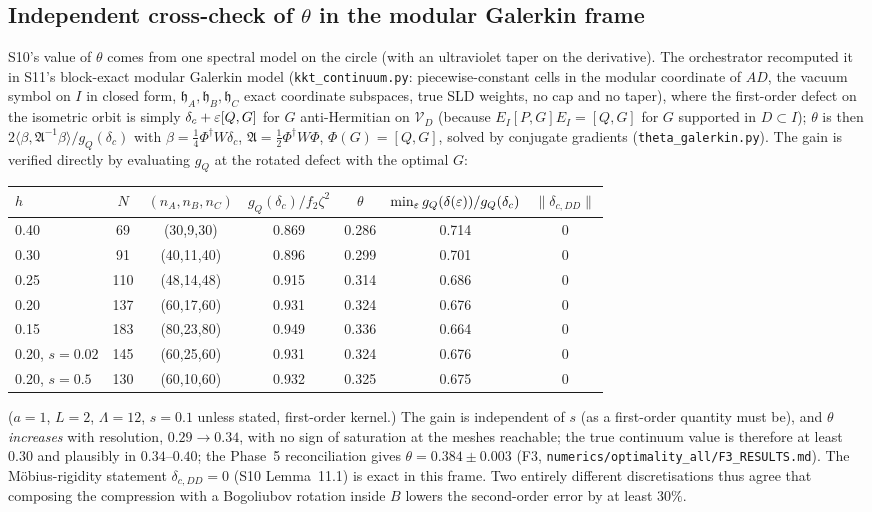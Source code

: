 \documentclass[11pt,a4paper]{article}
\newcommand{\hh}{\mathfrak h}\newcommand{\Var}{\operatorname{Var}}
\begin{document}
\subsection{Independent cross-check of \(\theta\) in the modular Galerkin frame}\label{sec:galerkin}
S10's value of \(\theta\) comes from one spectral model on the circle (with an ultraviolet taper on
the derivative).  The orchestrator recomputed it in S11's block-exact modular Galerkin model
(\texttt{kkt\_continuum.py}: piecewise-constant cells in the modular coordinate of \(AD\), the
vacuum symbol on \(I\) in closed form, \(\hh_A,\hh_B,\hh_C\) exact coordinate subspaces, true SLD
weights, no cap and no taper), where the first-order defect on the isometric orbit is simply
\(\delta_c+\varepsilon[Q,G]\) for \(G\) anti-Hermitian on \(\mathcal V_D\) (because \(E_I[P,G]E_I=[Q,G]\) for
\(G\) supported in \(D\subset I\)); \(\theta\) is then \(2\langle\beta,\mathfrak A^{-1}\beta\rangle/g_Q(\delta_c)\)
with \(\beta=\frac14\Phi^\dagger W\delta_c\), \(\mathfrak A=\frac12\Phi^\dagger W\Phi\), \(\Phi(G)=[Q,G]\),
solved by conjugate gradients (\texttt{theta\_galerkin.py}).  The gain is verified directly by
evaluating \(g_Q\) at the rotated defect with the optimal \(G\):
\begin{center}\small
\begin{tabular}{lcccccc}
\toprule
\(h\) & \(N\) & \((n_A,n_B,n_C)\) & \(g_Q(\delta_c)/f_2\zeta^2\) & \(\theta\) & \(\min_\varepsilon g_Q(\delta(\varepsilon))/g_Q(\delta_c)\) & \(\|\delta_{c,DD}\|\)\\
\midrule
0.40 & 69 & (30,9,30) & 0.869 & 0.286 & 0.714 & 0\\
0.30 & 91 & (40,11,40) & 0.896 & 0.299 & 0.701 & 0\\
0.25 & 110 & (48,14,48) & 0.915 & 0.314 & 0.686 & 0\\
0.20 & 137 & (60,17,60) & 0.931 & 0.324 & 0.676 & 0\\
0.15 & 183 & (80,23,80) & 0.949 & 0.336 & 0.664 & 0\\
\midrule
0.20, \(s=0.02\) & 145 & (60,25,60) & 0.931 & 0.324 & 0.676 & 0\\
0.20, \(s=0.5\) & 130 & (60,10,60) & 0.932 & 0.325 & 0.675 & 0\\
\bottomrule
\end{tabular}
\end{center}
(\(a=1\), \(L=2\), \(\Lambda=12\), \(s=0.1\) unless stated, first-order kernel.)  The gain is
independent of \(s\) (as a first-order quantity must be), and \(\theta\) \emph{increases} with
resolution, \(0.29\to0.34\), with no sign of saturation at the meshes reachable; the true continuum
value is therefore at least \(0.30\) and plausibly in \(0.34\)--\(0.40\); the Phase~5
reconciliation gives \(\theta=0.384\pm0.003\) (F3, \texttt{numerics/optimality\_all/F3\_RESULTS.md}).  The M\"obius-rigidity
statement \(\delta_{c,DD}=0\) (S10 Lemma~11.1) is exact in this frame.  Two entirely different
discretisations thus agree that composing the compression with a Bogoliubov rotation inside \(B\)
lowers the second-order error by at least \(30\%\).
\end{document}
